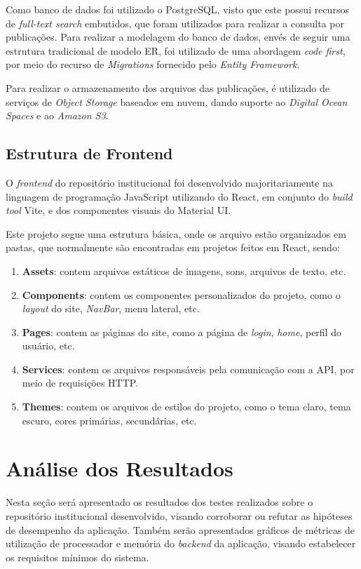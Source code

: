 Como banco de dados foi utilizado o PostgreSQL, visto que este possui recursos de
\emph{full-text search} embutidos, que foram utilizados para realizar a consulta
por publicações. Para realizar a modelagem do banco de dados, envés de seguir
uma estrutura tradicional de modelo ER, foi utilizado de uma abordagem
\emph{code first}, por meio do recurso de \emph{Migrations} fornecido pelo
\emph{Entity Framework}.

Para realizar o armazenamento dos arquivos das publicações, é utilizado de serviços de
\emph{Object Storage} baseados em nuvem, dando suporte ao \emph{Digital Ocean Spaces}
e ao \emph{Amazon S3}.

\subsection{Estrutura de Frontend}

O \emph{frontend} do repositório institucional foi desenvolvido majoritariamente
na linguagem de programação JavaScript utilizando do React, em conjunto do
\emph{build tool} Vite, e dos componentes visuais do Material UI.

Este projeto segue uma estrutura básica, onde os arquivo estão organizados
em pastas, que normalmente são encontradas em projetos feitos em React, sendo:
\begin{enumerate}
    \item \textbf{Assets}: contem arquivos estáticos de imagens, sons,
          arquivos de texto, etc.
    \item \textbf{Components}: contem os componentes personalizados do projeto,
          como o \emph{layout} do site, \emph{NavBar}, menu lateral, etc.
    \item \textbf{Pages}: contem as páginas do site, como a página de \emph{login},
          \emph{home}, perfil do usuário, etc.
    \item \textbf{Services}: contem os arquivos responsáveis pela comunicação
          com a API, por meio de requisições HTTP.
    \item \textbf{Themes}: contem os arquivos de estilos do projeto, como
          o tema claro, tema escuro, cores primárias, secundárias, etc.
\end{enumerate}


\section{Análise dos Resultados}

Nesta seção será apresentado os resultados dos testes realizados
sobre o repositório institucional desenvolvido, visando corroborar ou refutar
as hipóteses de desempenho da aplicação. Também serão apresentados gráficos de
métricas de utilização de processador e memória do \emph{backend} da aplicação,
visando estabelecer os requisitos mínimos do sistema.

